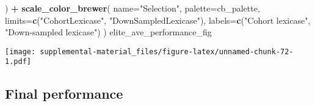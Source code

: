 \documentclass[]{book}
\newenvironment{Shaded}{\begin{snugshade}}{\end{snugshade}}
\newcommand{\CommentTok}[1]{\textcolor[rgb]{0.56,0.35,0.01}{\textit{#1}}}
\newcommand{\DataTypeTok}[1]{\textcolor[rgb]{0.13,0.29,0.53}{#1}}
\newcommand{\DecValTok}[1]{\textcolor[rgb]{0.00,0.00,0.81}{#1}}
\newcommand{\FloatTok}[1]{\textcolor[rgb]{0.00,0.00,0.81}{#1}}
\newcommand{\KeywordTok}[1]{\textcolor[rgb]{0.13,0.29,0.53}{\textbf{#1}}}
\newcommand{\NormalTok}[1]{#1}
\newcommand{\OperatorTok}[1]{\textcolor[rgb]{0.81,0.36,0.00}{\textbf{#1}}}
\newcommand{\StringTok}[1]{\textcolor[rgb]{0.31,0.60,0.02}{#1}}
\begin{document}
\begin{Shaded}
\begin{Highlighting}[]
\NormalTok{  ) }\OperatorTok{+}
\StringTok{  }\KeywordTok{scale_color_brewer}\NormalTok{(}
    \DataTypeTok{name=}\StringTok{"Selection"}\NormalTok{,}
    \DataTypeTok{palette=}\NormalTok{cb_palette,}
    \DataTypeTok{limits=}\KeywordTok{c}\NormalTok{(}\StringTok{"CohortLexicase"}\NormalTok{, }\StringTok{"DownSampledLexicase"}\NormalTok{),}
    \DataTypeTok{labels=}\KeywordTok{c}\NormalTok{(}\StringTok{"Cohort lexicase"}\NormalTok{, }\StringTok{"Down-sampled lexicase"}\NormalTok{)}
\NormalTok{  )}
\NormalTok{elite_ave_performance_fig}
\end{Highlighting}
\end{Shaded}

\texttt{[image: supplemental-material\_files/figure-latex/unnamed-chunk-72-1.pdf]}

\hypertarget{final-performance-6}{%
\subsection{Final performance}\label{final-performance-6}}

\begin{Shaded}
\end{Shaded}
\end{document}
